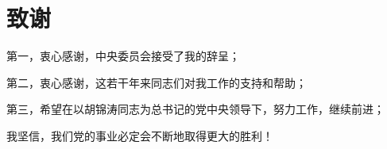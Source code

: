 \titleformat{\chapter}{\centering\xiaosan\hei}{\chaptername}{2em}{} %




\chapter*{致\quad 谢}

第一，衷心感谢，中央委员会接受了我的辞呈；

第二，衷心感谢，这若干年来同志们对我工作的支持和帮助；

第三，希望在以胡锦涛同志为总书记的党中央领导下，努力工作，继续前进；

我坚信，我们党的事业必定会不断地取得更大的胜利！

\clearpage